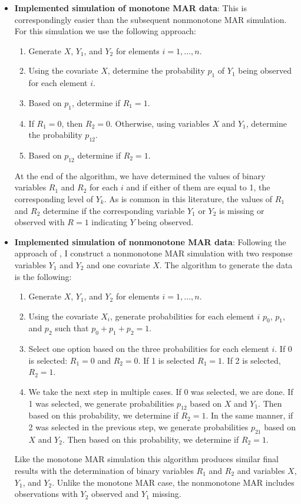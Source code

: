 \documentclass[12pt]{article}
\begin{document}
\begin{itemize}
  \item \textbf{Implemented simulation of monotone MAR data}: 
    This is correspondingly easier than the subsequent nonmonotone MAR
    simulation. For this simulation we use the following approach:
  \begin{enumerate}
      \item Generate $X$, $Y_1$, and $Y_2$ for elements $i = 1, \dots, n$.
      \item Using the covariate $X$, determine the probability $p_1$ of $Y_1$
      being observed for each element $i$.
      \item Based on $p_1$, determine if $R_1 = 1$.
      \item If $R_1 = 0$, then $R_2 = 0$. Otherwise, using variables $X$ and
        $Y_1$, determine the probability $p_{12}$.
      \item Based on $p_{12}$ determine if $R_2 = 1$.
  \end{enumerate}
    At the end of the algorithm, we have determined the values of binary
    variables $R_1$ and $R_2$ for each $i$ and if either of them are equal to 1,
    the corresponding level of $Y_{k}$. As is common in this literature, the
    values of $R_1$ and $R_2$ determine if the corresponding variable $Y_1$ or
    $Y_2$ is missing or observed with $R = 1$ indicating $Y$ being observed.
  
  \item \textbf{Implemented simulation of nonmonotone MAR data}: 
    Following the approach of \cite{robins1997non}, I construct a nonmonotone
    MAR simulation with two response variables $Y_1$ and $Y_2$ and one covariate
    $X$. The algorithm to generate the data is the following:
    \begin{enumerate}
        \item Generate $X$, $Y_1$, and $Y_2$ for elements $i = 1, \dots, n$.
        \item Using the covariate $X_i$, generate probabilities for each element
          $i$ $p_0$, $p_1$, and $p_2$ such that $p_0 + p_1 + p_2 = 1$. 
        \item Select one option based on the three probabilities for each
          element $i$. If 0 is selected: $R_1 = 0$ and $R_2 = 0$. If 1 is
          selected $R_1 = 1$. If 2 is selected, $R_2 = 1$.
        \item We take the next step in multiple cases. If 0 was selected, we are
          done. If 1 was selected, we generate probabilities $p_{12}$ based on
          $X$ and $Y_1$. Then based on this probability, we determine if $R_2 =
          1$. In the same manner, if 2 was selected in the previous step, we
          generate probabilities $p_{21}$ based on $X$ and $Y_2$. Then based on
          this probability, we determine if $R_2 = 1$.
    \end{enumerate}
    Like the monotone MAR simulation this algorithm produces similar final
    results with the determination of binary variables $R_1$ and $R_2$ and
    variables $X$, $Y_1$, and $Y_2$. Unlike the monotone MAR case, the
    nonmonotone MAR includes observations with $Y_2$ observed and $Y_1$ missing.
    

\end{itemize}
\end{document}
